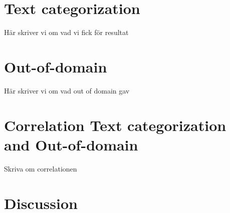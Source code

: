 \section{Text categorization}
Här skriver vi om vad vi fick för resultat
\section{Out-of-domain}
Här skriver vi om vad out of domain gav
\section{Correlation Text categorization and Out-of-domain}
Skriva om correlationen

\section{Discussion}

